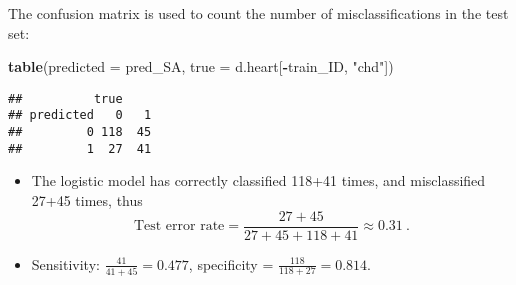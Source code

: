 \documentclass[10pt,ignorenonframetext,]{beamer}
\newenvironment{Shaded}{\begin{snugshade}}{\end{snugshade}}
\newcommand{\DataTypeTok}[1]{\textcolor[rgb]{0.13,0.29,0.53}{#1}}
\newcommand{\KeywordTok}[1]{\textcolor[rgb]{0.13,0.29,0.53}{\textbf{#1}}}
\newcommand{\NormalTok}[1]{#1}
\newcommand{\OperatorTok}[1]{\textcolor[rgb]{0.81,0.36,0.00}{\textbf{#1}}}
\newcommand{\StringTok}[1]{\textcolor[rgb]{0.31,0.60,0.02}{#1}}
\providecommand{\tightlist}{%
  \setlength{\itemsep}{0pt}\setlength{\parskip}{0pt}}
\begin{document}
\begin{frame}[fragile]

The confusion matrix is used to count the number of misclassifications
in the test set:

\vspace{2mm}

\scriptsize

\begin{Shaded}
\begin{Highlighting}[]
\KeywordTok{table}\NormalTok{(}\DataTypeTok{predicted =}\NormalTok{ pred_SA, }\DataTypeTok{true =}\NormalTok{ d.heart[}\OperatorTok{-}\NormalTok{train_ID, }\StringTok{"chd"}\NormalTok{])}
\end{Highlighting}
\end{Shaded}

\begin{verbatim}
##          true
## predicted   0   1
##         0 118  45
##         1  27  41
\end{verbatim}

\vspace{2mm}

\normalsize

\begin{itemize}
\tightlist
\item
  The logistic model has correctly classified 118+41 times, and
  misclassified 27+45 times, thus
  \[\text{Test error rate} = \frac{27+45}{27+45+118+41} \approx 0.31 \ .\]
\item
  Sensitivity: \(\frac{41}{41+45}=0.477\), specificity =
  \(\frac{118}{118+27}=0.814.\)
\end{itemize}

\end{frame}
\end{document}
